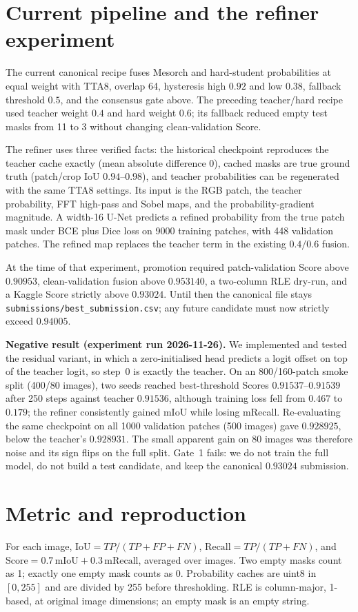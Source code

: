 \documentclass[10pt]{article}
\begin{document}
\section{Current pipeline and the refiner experiment}
The current canonical recipe fuses Mesorch and hard-student probabilities at equal weight with TTA8, overlap 64, hysteresis high $0.92$ and low $0.38$, fallback threshold $0.5$, and the consensus gate above. The preceding teacher/hard recipe used teacher weight $0.4$ and hard weight $0.6$; its fallback reduced empty test masks from 11 to 3 without changing clean-validation Score.

The refiner uses three verified facts: the historical checkpoint reproduces the teacher cache exactly (mean absolute difference $0$), cached masks are true ground truth (patch/crop IoU $0.94$--$0.98$), and teacher probabilities can be regenerated with the same TTA8 settings. Its input is the RGB patch, the teacher probability, FFT high-pass and Sobel maps, and the probability-gradient magnitude. A width-16 U-Net predicts a refined probability from the true patch mask under BCE plus Dice loss on 9000 training patches, with 448 validation patches. The refined map replaces the teacher term in the existing $0.4/0.6$ fusion.

At the time of that experiment, promotion required patch-validation Score above $0.90953$, clean-validation fusion above $0.953140$, a two-column RLE dry-run, and a Kaggle Score strictly above $0.93024$. Until then the canonical file stays \texttt{submissions/best\_submission.csv}; any future candidate must now strictly exceed $0.94005$.

\textbf{Negative result (experiment run 2026-11-26).} We implemented and tested the residual variant, in which a zero-initialised head predicts a logit offset on top of the teacher logit, so step~0 is exactly the teacher. On an 800/160-patch smoke split (400/80 images), two seeds reached best-threshold Scores $0.91537$--$0.91539$ after 250 steps against teacher $0.91536$, although training loss fell from $0.467$ to $0.179$; the refiner consistently gained mIoU while losing mRecall. Re-evaluating the same checkpoint on all 1000 validation patches (500 images) gave $0.928925$, below the teacher's $0.928931$. The small apparent gain on 80 images was therefore noise and its sign flips on the full split. Gate~1 fails: we do not train the full model, do not build a test candidate, and keep the canonical $0.93024$ submission.

\section{Metric and reproduction}
For each image, $\mathrm{IoU}=TP/(TP+FP+FN)$, $\mathrm{Recall}=TP/(TP+FN)$, and $\mathrm{Score}=0.7\,\mathrm{mIoU}+0.3\,\mathrm{mRecall}$, averaged over images. Two empty masks count as 1; exactly one empty mask counts as 0. Probability caches are uint8 in $[0,255]$ and are divided by 255 before thresholding. RLE is column-major, 1-based, at original image dimensions; an empty mask is an empty string.
\end{document}
